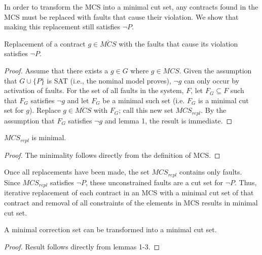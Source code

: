 In order to transform the MCS into a minimal cut set, any contracts found in the MCS must be replaced with faults that cause their violation. We show that making this replacement still satisfies $\neg P$.

\begin{lemma}
	Replacement of a contract $g \in \overline{MCS}$ with the faults that cause its violation satisfies $\neg P$.
	\begin{proof}
	Assume that there exists a $g \in G$ where $g \in MCS$. Given the assumption that $G \cup \{P\}$ is SAT (i.e., the nominal model proves), $\neg g$ can only occur by activation of faults. For the set of all faults in the system, $F$, let $F_G \subseteq F$ such that $F_G$ satisfies $\neg g$ and let $F_G$ be a minimal such set (i.e. $F_G$ is a minimal cut set for $g$). Replace $g \in \overline{MCS}$ with $F_G$; call this new set $MCS_{repl}$. By the assumption that $F_G$ satisfies $\neg g$ and lemma 1, the result is immediate.
	\end{proof}
	\label{lem:corrSet}
\end{lemma}
\vspace{-2em}

\begin{lemma}
$MCS_{repl}$ is minimal.
\begin{proof}
The minimality follows directly from the definition of MCS. 

\end{proof}
\label{lem:minCorrSet}
\end{lemma}
\vspace{-2em}
Once all replacements have been made, the set $MCS_{repl}$ contains only faults. Since $MCS_{repl}$ satisfies $\neg P$, these unconstrained faults are a cut set for $\neg P$. Thus, iterative replacement of each contract in an MCS with a minimal cut set of that contract and removal of all constraints of the elements in MCS results in minimal cut set. 

\begin{theorem}
A minimal correction set can be transformed into a minimal cut set.
\begin{proof}
Result follows directly from lemmas 1-3.
\end{proof}
\end{theorem}







